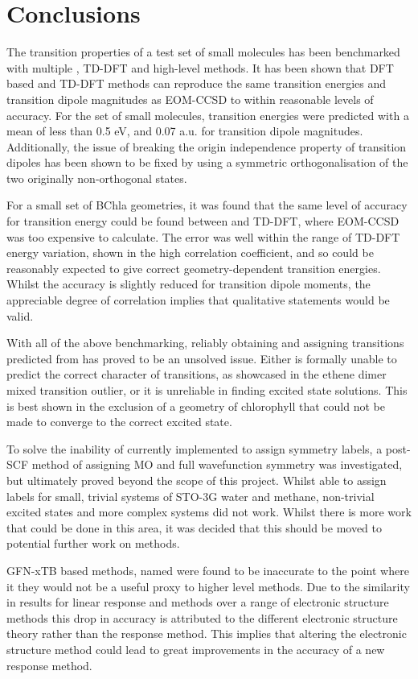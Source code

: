 \section{Conclusions}
\label{sec:dxtb_conclusions}
The transition properties of a test set of small molecules has been benchmarked 
with multiple \dscf, TD-DFT and high-level methods. It has been shown that DFT 
based \dscf and TD-DFT methods can reproduce the same transition energies and 
transition dipole magnitudes as EOM-CCSD to within reasonable levels
of accuracy. For the set of small molecules, transition energies were predicted
with a mean of less than 0.5 eV, and 0.07 a.u. for transition dipole magnitudes.
Additionally, the issue of breaking the origin independence property of transition
dipoles has been shown to be fixed by using a symmetric orthogonalisation of the 
two originally non-orthogonal states.

For a small set of BChla geometries, it was found that the same level of accuracy
for transition energy could be found between \dscf and TD-DFT, where EOM-CCSD was
too expensive to calculate. The error was well within the range of TD-DFT energy
variation, shown in the high correlation coefficient, and so \dscf could be reasonably
expected to give correct geometry-dependent transition energies. Whilst the accuracy
is slightly reduced for transition dipole moments, the appreciable degree of correlation
implies that qualitative statements would be valid.

With all of the above benchmarking, reliably obtaining and assigning transitions
predicted from \dscf has proved to be an unsolved issue. Either \dscf is formally
unable to predict the correct character of transitions, as showcased in the ethene 
dimer mixed transition outlier, or it is unreliable in finding excited state solutions.
This is best shown in the exclusion of a geometry of chlorophyll that could not
be made to converge to the correct excited state.

To solve the inability of currently implemented \dscf to assign symmetry labels,
a post-SCF method of assigning MO and full wavefunction symmetry was investigated,
but ultimately proved beyond the scope of this project. Whilst able to assign labels
for small, trivial systems of STO-3G water and methane, non-trivial excited states
and more complex systems did not work. Whilst there is more work that could be done
in this area, it was decided that this should be moved to potential further work
on \dscf methods.

GFN-xTB based methods, named \dxtb were found to be inaccurate to the point where
it they would not be a useful proxy to higher level methods. Due to the similarity
in results for linear response and \dscf methods over a range of electronic structure
methods this drop in accuracy is attributed to the different electronic structure 
theory rather than the response method. This implies that altering the electronic
structure method could lead to great improvements in the accuracy of a new response 
method.

